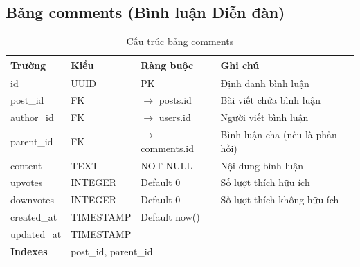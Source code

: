 \documentclass[12pt,a4paper]{article}
\begin{document}
\subsection{Bảng comments (Bình luận Diễn đàn)}
\begin{longtable}{|l|l|l|p{5.5cm}|}
    \caption{Cấu trúc bảng comments}                                                                                           \\
    \hline
    \rowcolor{headerblue}
    \textbf{Trường}  & \textbf{Kiểu}                             & \textbf{Ràng buộc}        & \textbf{Ghi chú}                \\
    \hline
    id               & UUID                                      & PK                        & Định danh bình luận             \\
    \hline
    post\_id         & FK                                        & $\rightarrow$ posts.id    & Bài viết chứa bình luận         \\
    \hline
    author\_id       & FK                                        & $\rightarrow$ users.id    & Người viết bình luận            \\
    \hline
    parent\_id       & FK                                        & $\rightarrow$ comments.id & Bình luận cha (nếu là phản hồi) \\
    \hline
    content          & TEXT                                      & NOT NULL                  & Nội dung bình luận              \\
    \hline
    upvotes          & INTEGER                                   & Default 0                 & Số lượt thích hữu ích           \\
    \hline
    downvotes        & INTEGER                                   & Default 0                 & Số lượt thích không hữu ích     \\
    \hline
    created\_at      & TIMESTAMP                                 & Default now()             &                                 \\
    \hline
    updated\_at      & TIMESTAMP                                 &                           &                                 \\
    \hline
    \rowcolor{headerblue}
    \textbf{Indexes} & \multicolumn{3}{l|}{post\_id, parent\_id}                                                               \\
    \hline
\end{longtable}
\end{document}
